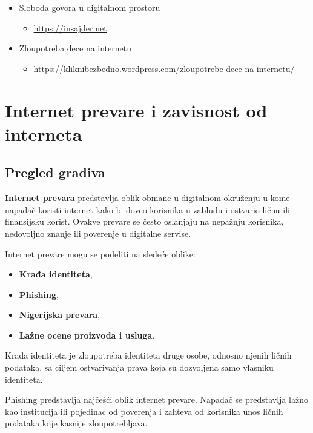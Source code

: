\documentclass[a4paper, 12pt]{article}
\begin{document}
\begin{itemize}
    \item Sloboda govora u digitalnom prostoru
    \begin{itemize}
        \item {\href{https://insajder.net/vesti/sloboda-govora-u-digitalnom-prostoru-ko-stoji-iza-gasenja-instagram-naloga-medija-i-nvo}{https://insajder.net}}
    \end{itemize}
    \item Zloupotreba dece na internetu
    \begin{itemize}
        \item \url{https://kliknibezbedno.wordpress.com/zloupotrebe-dece-na-internetu/}
    \end{itemize}
    
\end{itemize}

\section{Internet prevare i zavisnost od interneta}
\subsection{Pregled gradiva}
\textbf{Internet prevara} predstavlja oblik obmane u digitalnom okruženju u kome napadač
koristi internet kako bi doveo korisnika u zabludu i ostvario
ličnu ili finansijsku korist. Ovakve prevare se često oslanjaju na nepažnju korisnika,
nedovoljno znanje ili poverenje u digitalne servise.

Internet prevare mogu se podeliti na sledeće oblike:
\begin{itemize}
    \item \textbf{Krađa identiteta},
    \item \textbf{Phishing},
    \item \textbf{Nigerijska prevara},
    \item \textbf{Lažne ocene proizvoda i usluga}.
\end{itemize}

Krađa identiteta je zloupotreba identiteta druge osobe, odnosno njenih ličnih podataka, sa
ciljem ostvarivanja prava koja su dozvoljena samo vlasniku identiteta.

Phishing predstavlja najčešći oblik internet prevare. Napadač se predstavlja lažno kao institucija ili pojedinac od poverenja i zahteva od korisnika unos ličnih podataka koje kasnije zloupotrebljava.
\end{document}
